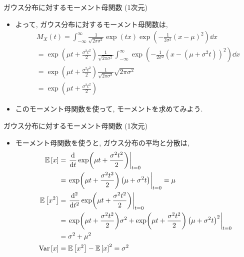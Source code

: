 \documentclass[dvipdfmx,notheorems,t]{beamer}
\begin{document}
\begin{frame}{ガウス分布に対するモーメント母関数 (1次元)}
\begin{itemize}
  \item よって, ガウス分布に対するモーメント母関数は,
  \begin{align*}
    & M_X(t) = \int_{-\infty}^\infty \frac{1}{\sqrt{2\pi \sigma^2}} \exp(tx)
      \exp(-\frac{1}{2 \sigma^2} \left( x - \mu \right)^2) \dd{x} \\
      &= \exp(\mu t + \frac{\sigma^2 t^2}{2}) \frac{1}{\sqrt{2\pi \sigma^2}}
        \int_{-\infty}^\infty \exp(-\frac{1}{2 \sigma^2}
        \left( x - \left( \mu + \sigma^2 t \right) \right)^2) \dd{x} \\
      &= \exp(\mu t + \frac{\sigma^2 t^2}{2}) \frac{1}{\sqrt{2\pi \sigma^2}}
        \sqrt{2\pi \sigma^2} \\
      &= \exp(\mu t + \frac{\sigma^2 t^2}{2})
  \end{align*}
  \item このモーメント母関数を使って, モーメントを求めてみよう.
\end{itemize}
\end{frame}

\begin{frame}{ガウス分布に対するモーメント母関数 (1次元)}
\begin{itemize}
  \item モーメント母関数を使うと, ガウス分布の平均と分散は,
  \begin{align*}
    \operatorname{\mathbb{E}} \left[ x \right] &= \left. \dv{t} \exp(\mu t + \frac{\sigma^2 t^2}{2}) \right|_{t = 0} \\
      &= \left. \exp(\mu t + \frac{\sigma^2 t^2}{2}) \left( \mu + \sigma^2 t \right) \right|_{t = 0}
      = \mu \\
    \operatorname{\mathbb{E}} \left[ x^2 \right] &= \left. \dv[2]{t} \exp(\mu t + \frac{\sigma^2 t^2}{2}) \right|_{t = 0} \\
      &= \left. \exp(\mu t + \frac{\sigma^2 t^2}{2}) \sigma^2 +
        \exp(\mu t + \frac{\sigma^2 t^2}{2}) \left( \mu + \sigma^2 t \right)^2 \right|_{t = 0} \\
      &= \sigma^2 + \mu^2 \\
    \operatorname{Var} \left[ x \right] &= \operatorname{\mathbb{E}} \left[ x^2 \right] - \operatorname{\mathbb{E}} \left[ x \right]^2 = \sigma^2
  \end{align*}
\end{itemize}
\end{frame}
\end{document}
